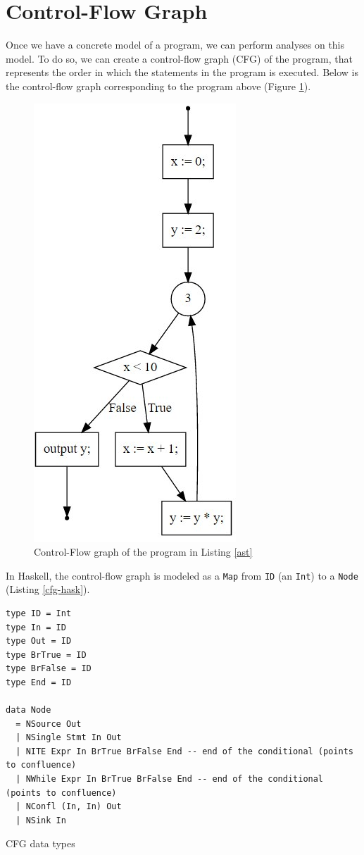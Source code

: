 \documentclass{article}
\begin{document}
\section{Control-Flow Graph}\label{control-flow-graph}

Once we have a concrete model of a program, we can perform analyses on
this model. To do so, we can create a control-flow graph (CFG) of the
program, that represents the order in which the statements in the program is
executed. Below is the control-flow graph corresponding to the program
above (Figure \ref{cfg-fig}).

\begin{figure}[H]
\centering
\includegraphics{./imgs/in10-cfg.jpg}
\caption{Control-Flow graph of the program in Listing \ref{ast}}
\label{cfg-fig}
\end{figure}

In Haskell, the control-flow graph is modeled as a \texttt{Map} from
\texttt{ID} (an \texttt{Int}) to a \texttt{Node} (Listing \ref{cfg-hask}).

\begin{listing}[H]
\begin{verbatim}
type ID = Int
type In = ID
type Out = ID
type BrTrue = ID
type BrFalse = ID
type End = ID

data Node
  = NSource Out
  | NSingle Stmt In Out
  | NITE Expr In BrTrue BrFalse End -- end of the conditional (points to confluence)
  | NWhile Expr In BrTrue BrFalse End -- end of the conditional (points to confluence)
  | NConfl (In, In) Out
  | NSink In
\end{verbatim}
\caption{CFG data types}
\label{cfg-hask}
\end{listing}
\end{document}
